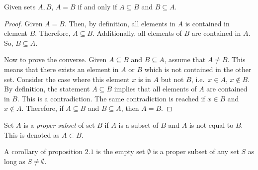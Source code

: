 \bigskip
\bigskip
\begin{proposition}
    Given sets \(A,B\), \(A=B\) if and only if \(A\subseteq B\) and \(B\subseteq A\).
\end{proposition}
\begin{proof}
    Given \(A=B\). Then, by definition, all elements in \(A\) is contained in element \(B\). Therefore, \(A\subseteq B\).
    Additionally, all elements of \(B\) are contained in \(A\). So, \(B\subseteq A\).

    Now to prove the converse. Given \(A\subseteq B\) and \(B\subseteq A\), assume that \(A\ne B\). This means that there exists an element
    in \(A\) or \(B\) which is not contained in the other set. Consider the case where this element \(x\) is in \(A\) but not \(B\), i.e.\
    \(x\in A\), \(x\not\in B\). By definition, the statement \(A\subseteq B\) implies that all elements of \(A\) are contained in \(B\). This
    is a contradiction. The same contradiction is reached if \(x\in B\) and \(x\not\in A\). Therefore, if \(A\subseteq B\) and \(B\subseteq A\),
    then \(A=B\).
\end{proof}

\bigskip

\begin{definition}
    Set \(A\) is a \emph{proper subset} of set \(B\) if \(A\) is a subset of \(B\) and \(A\) is not equal to \(B\). This is denoted as \(A\subset B\).
\end{definition}

A corollary of proposition \(2.1\) is the empty set \(\emptyset\) is a proper subset of any set \(S\) as long as \(S\ne\emptyset\).

